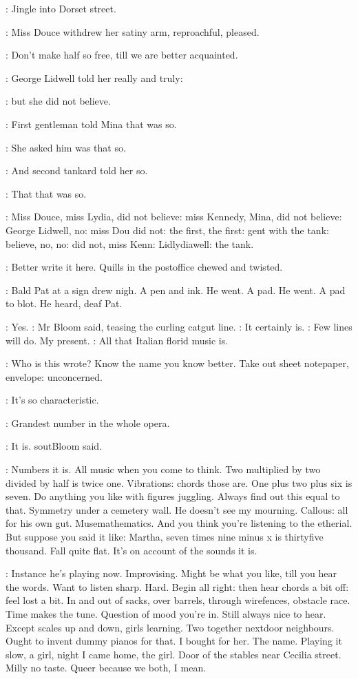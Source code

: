 :
Jingle into Dorset street.

:
Miss Douce withdrew her satiny arm, reproachful, pleased.

\MissD:
Don't make half so free, till we are better acquainted.

:
George Lidwell told her really and truly:

:
but she did not believe.

:
First gentleman told Mina that was so.

:
She asked him was that so.

:
And second tankard told her so.

:
That that was so.

:
Miss Douce, miss Lydia, did not believe: miss Kennedy, Mina, did not
believe: George Lidwell, no: miss Dou did not: the first, the first: gent
with the tank:
believe, no, no: did not, miss Kenn: Lidlydiawell: the
tank.

\BloomInt:
Better write it here.
Quills in the postoffice chewed and twisted.

:
Bald Pat at a sign drew nigh. A pen and ink. He went. A pad. He
went. A pad to blot. He heard, deaf Pat.

\Bloom:
Yes.
:
Mr Bloom said, teasing the curling catgut line.
\Bloom:
It certainly is.
\BloomInt:
Few lines will do. My present.
\Bloom:
All that Italian florid music is.

\BloomInt:
Who is this wrote? Know the name you know better.
Take out sheet notepaper, envelope: unconcerned.

\Bloom:
It's so characteristic.

\Goulding:
Grandest number in the whole opera.

\Bloom:
It is.
sout{Bloom said.}

\BloomInt:
Numbers it is.
All music when you come to think. Two multiplied by two
divided by half is twice one. Vibrations: chords those are. One plus two
plus six is seven. Do anything you like with figures juggling. Always find
out this equal to that. Symmetry under a cemetery wall. He doesn't see my
mourning. Callous: all for his own gut. Musemathematics. And you think
you're listening to the etherial. But suppose you said it like: Martha,
seven times nine minus x is thirtyfive thousand. Fall quite flat. It's on
account of the sounds it is.

\BloomInt:
Instance he's playing now. Improvising. Might be what you like, till
you hear the words. Want to listen sharp. Hard. Begin all right: then hear
chords a bit off: feel lost a bit.
In and out of sacks, over barrels,
through wirefences, obstacle race. Time makes the tune. Question of mood
you're in. Still always nice to hear. Except scales up and down, girls
learning. Two together nextdoor neighbours. Ought to invent dummy pianos
for that.
I bought for her. The name. Playing it slow, a girl,
night I came home, the girl. Door of the stables near Cecilia street.
Milly no taste. Queer because we both, I mean.

